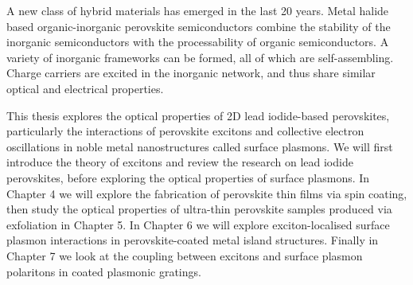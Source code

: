 A new class of hybrid materials has emerged in the last 20 years. Metal halide based organic-inorganic perovskite semiconductors combine the stability of the inorganic semiconductors with the processability of organic semiconductors. A variety of inorganic frameworks can be formed, all of which are self-assembling. Charge carriers are excited in the inorganic network, and thus share similar optical and electrical properties.

This thesis explores the optical properties of 2D lead iodide-based perovskites, particularly the interactions of perovskite excitons and collective electron oscillations in noble metal nanostructures called surface plasmons. We will first introduce the theory of excitons and review the research on lead iodide perovskites, before exploring the optical properties of surface plasmons. In Chapter 4 we will explore the fabrication of perovskite thin films via spin coating, then study the optical properties of ultra-thin perovskite samples produced via exfoliation in Chapter 5. In Chapter 6 we will explore exciton-localised surface plasmon interactions in perovskite-coated metal island structures. Finally in Chapter 7 we look at the coupling between excitons and surface plasmon polaritons in coated plasmonic gratings.